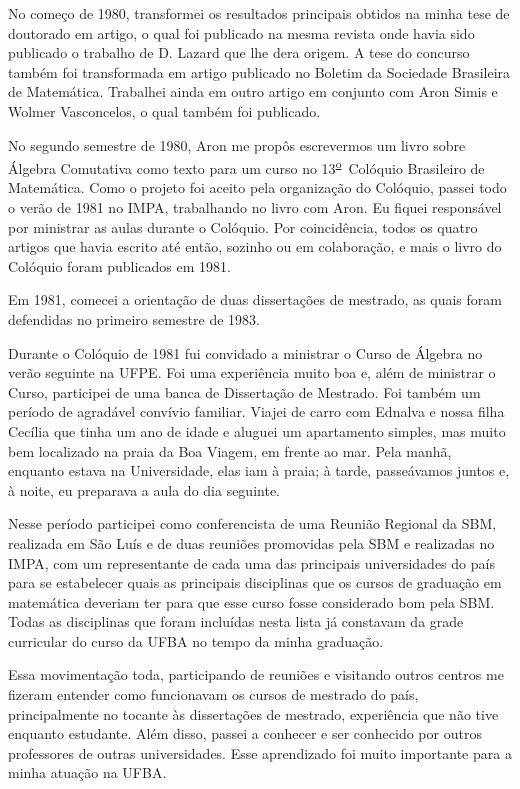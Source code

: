 \documentclass{hipatia}
\newcommand{\superou}{\textsuperscript{\underline{o}}~}
\begin{document}
No começo de 1980, transformei os resultados principais
obtidos na minha tese de doutorado em artigo, o qual foi
publicado na mesma revista onde havia sido publicado o
trabalho de D. Lazard que lhe dera origem. A tese do
concurso também foi transformada em artigo publicado no
Boletim da Sociedade Brasileira de Matemática. Trabalhei
ainda em outro artigo em conjunto com Aron Simis e Wolmer
Vasconcelos, o qual também foi publicado. 

No segundo semestre de 1980, Aron me propôs escrevermos um
livro sobre Álgebra Comutativa como texto para um curso no
13\superou  Colóquio Brasileiro de Matemática. Como o projeto foi
aceito pela organização do Colóquio, passei todo o verão de
1981 no IMPA, trabalhando no livro com Aron. Eu fiquei
responsável por ministrar as aulas durante o Colóquio. Por
coincidência, todos os quatro artigos que havia escrito até
então, sozinho ou em colaboração, e mais o livro do Colóquio
foram publicados em 1981.

Em 1981, comecei a orientação de duas dissertações de
mestrado, as quais foram defendidas no primeiro semestre de
1983. 

Durante o Colóquio de 1981 fui convidado a ministrar o Curso
de Álgebra no verão seguinte na UFPE. Foi uma experiência
muito boa e, além de ministrar o Curso, participei de uma
banca de Dissertação de Mestrado. Foi também um período de
agradável convívio familiar. Viajei de carro com Ednalva e
nossa filha Cecília que tinha um ano de idade e aluguei um
apartamento simples, mas muito bem localizado na praia da
Boa Viagem, em frente ao mar. Pela manhã, enquanto estava na
Universidade, elas iam à praia; à tarde, passeávamos juntos
e, à noite, eu preparava a aula do dia seguinte.

Nesse período participei como conferencista de uma Reunião
Regional da SBM, realizada em São Luís e de duas reuniões
promovidas pela SBM e realizadas no IMPA, com um
representante de cada uma das principais universidades do
país para se estabelecer quais as principais disciplinas que
os cursos de graduação em matemática deveriam ter para que
esse curso fosse considerado bom pela SBM. Todas as
disciplinas que foram incluídas nesta lista já constavam da
grade curricular do curso da UFBA no tempo da minha
graduação. 

Essa movimentação toda, participando de reuniões e visitando
outros centros me fizeram entender como funcionavam os
cursos de mestrado do país, principalmente no tocante às
dissertações de mestrado, experiência que não tive enquanto
estudante. Além disso, passei a conhecer e ser conhecido por
outros professores de outras universidades. Esse aprendizado
foi muito importante para a minha atuação na UFBA.
\end{document}
